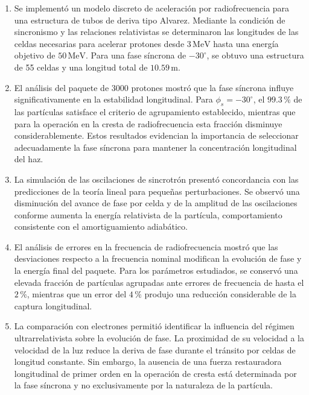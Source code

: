 \begin{enumerate}

    \item Se implementó un modelo discreto de aceleración por radiofrecuencia para una estructura de tubos de deriva tipo Alvarez. Mediante la condición de sincronismo y las relaciones relativistas se determinaron las longitudes de las celdas necesarias para acelerar protones desde $3\,\mathrm{MeV}$ hasta una energía objetivo de $50\,\mathrm{MeV}$. Para una fase síncrona de $-30^\circ$, se obtuvo una estructura de 55 celdas y una longitud total de $10.59\,\mathrm{m}$.

    \item El análisis del paquete de 3000 protones mostró que la fase síncrona influye significativamente en la estabilidad longitudinal. Para $\phi_s=-30^\circ$, el $99.3\,\%$ de las partículas satisface el criterio de agrupamiento establecido, mientras que para la operación en la cresta de radiofrecuencia esta fracción disminuye considerablemente. Estos resultados evidencian la importancia de seleccionar adecuadamente la fase síncrona para mantener la concentración longitudinal del haz.

    \item La simulación de las oscilaciones de sincrotrón presentó concordancia con las predicciones de la teoría lineal para pequeñas perturbaciones. Se observó una disminución del avance de fase por celda y de la amplitud de las oscilaciones conforme aumenta la energía relativista de la partícula, comportamiento consistente con el amortiguamiento adiabático.

    \item El análisis de errores en la frecuencia de radiofrecuencia mostró que las desviaciones respecto a la frecuencia nominal modifican la evolución de fase y la energía final del paquete. Para los parámetros estudiados, se conservó una elevada fracción de partículas agrupadas ante errores de frecuencia de hasta el $2\,\%$, mientras que un error del $4\,\%$ produjo una reducción considerable de la captura longitudinal.

    \item La comparación con electrones permitió identificar la influencia del régimen ultrarrelativista sobre la evolución de fase. La proximidad de su velocidad a la velocidad de la luz reduce la deriva de fase durante el tránsito por celdas de longitud constante. Sin embargo, la ausencia de una fuerza restauradora longitudinal de primer orden en la operación de cresta está determinada por la fase síncrona y no exclusivamente por la naturaleza de la partícula.

\end{enumerate}
